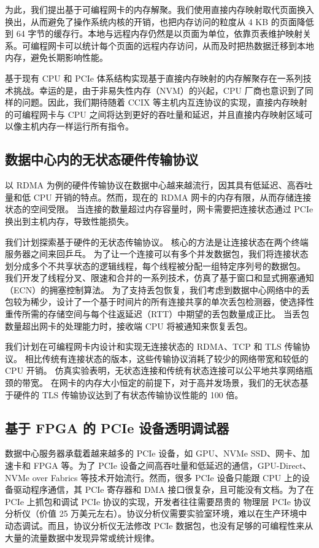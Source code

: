 为此，我们提出基于可编程网卡的内存解聚。我们使用直接内存映射取代页面换入换出，从而避免了操作系统内核的开销，也把内存访问的粒度从 4 KB 的页面降低到 64 字节的缓存行。本地与远程内存仍然是以页面为单位，依靠页表维护映射关系。可编程网卡可以统计每个页面的远程内存访问，从而及时把热数据迁移到本地内存，避免长期影响性能。

基于现有 CPU 和 PCIe 体系结构实现基于直接内存映射的内存解聚存在一系列技术挑战。幸运的是，由于非易失性内存（NVM）的兴起，CPU 厂商也意识到了同样的问题。因此，我们期待随着 CCIX 等主机内互连协议的实现，直接内存映射的可编程网卡与 CPU 之间将达到更好的吞吐量和延迟，并且直接内存映射区域可以像主机内存一样运行所有指令。


\subsection{数据中心内的无状态硬件传输协议}

以 RDMA 为例的硬件传输协议在数据中心越来越流行，因其具有低延迟、高吞吐量和低 CPU 开销的特点。然而，现在的 RDMA 网卡的内存有限，从而存储连接状态的空间受限。
当连接的数量超过内存容量时，网卡需要把连接状态通过 PCIe 换出到主机内存，导致性能损失。

我们计划探索基于硬件的无状态传输协议。
核心的方法是让连接状态在两个终端服务器之间来回乒乓。
为了让一个连接可以有多个并发数据包，我们将连接状态划分成多个不共享状态的逻辑线程，每个线程被分配一组特定序列号的数据包。
我们开发了线程分叉、限速和合并的一系列技术，仿真了基于窗口和显式拥塞通知（ECN）的拥塞控制算法。
为了支持丢包恢复，我们考虑到数据中心网络中的丢包较为稀少，设计了一个基于时间片的所有连接共享的单次丢包检测器，使选择性重传所需的存储空间与每个往返延迟（RTT）中期望的丢包数量成正比。
当丢包数量超出网卡的处理能力时，接收端 CPU 将被通知来恢复丢包。

我们计划在可编程网卡内设计和实现无连接状态的 RDMA、TCP 和 TLS 传输协议。
相比传统有连接状态的版本，这些传输协议消耗了较少的网络带宽和较低的 CPU 开销。
仿真实验表明，无状态连接和传统有状态连接可以公平地共享网络瓶颈的带宽。
在网卡的内存大小恒定的前提下，对于高并发场景，我们的无状态基于硬件的 TLS 传输协议达到了有状态传输协议性能的 100 倍。



\subsection{基于 FPGA 的 PCIe 设备透明调试器}

数据中心服务器承载着越来越多的 PCIe 设备，如 GPU、NVMe SSD、网卡、加速卡和 FPGA 等。为了 PCIe 设备之间高吞吐量和低延迟的通信，GPU-Direct、NVMe over Fabrics 等技术开始流行。然而，很多 PCIe 设备只能跟 CPU 上的设备驱动程序通信，其 PCIe 寄存器和 DMA 接口很复杂，且可能没有文档。为了在 PCIe 上抓包和调试 PCIe 协议的实现，开发者往往需要昂贵的 物理层 PCIe 协议分析仪（价值 25 万美元左右）。协议分析仪需要实验室环境，难以在生产环境中动态调试。而且，协议分析仪无法修改 PCIe 数据包，也没有足够的可编程性来从大量的流量数据中发现异常或统计规律。

